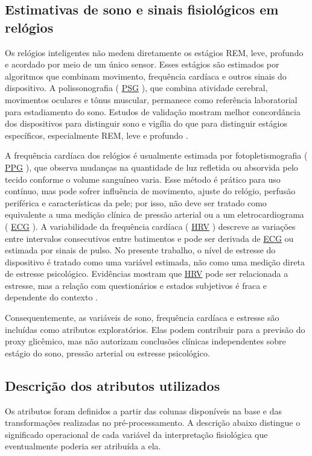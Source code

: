 \documentclass[12pt,a4paper]{article}
\DeclareRobustCommand{\sigla}[1]{%
    \texorpdfstring{\hyperlink{sigla:#1}{#1}}{#1}%
}
\begin{document}
\subsection{Estimativas de sono e sinais fisiológicos em relógios}
Os relógios inteligentes não medem diretamente os estágios REM, leve, profundo
e acordado por meio de um único sensor. Esses estágios são estimados por
algoritmos que combinam movimento, frequência cardíaca e outros sinais do
dispositivo. A polissonografia (\sigla{PSG}), que combina atividade cerebral,
movimentos oculares e tônus muscular, permanece como referência laboratorial
para estadiamento do sono. Estudos de validação mostram melhor concordância
dos dispositivos para distinguir sono e vigília do que para distinguir
estágios específicos, especialmente REM, leve e profundo
\cite{miller2022wearables}.

A frequência cardíaca dos relógios é usualmente estimada por
fotopletismografia (\sigla{PPG}), que observa mudanças na quantidade de luz refletida
ou absorvida pelo tecido conforme o volume sanguíneo varia. Esse método é
prático para uso contínuo, mas pode sofrer influência de movimento, ajuste do
relógio, perfusão periférica e características da pele; por isso, não deve ser
tratado como equivalente a uma medição clínica de pressão arterial ou a um
eletrocardiograma (\sigla{ECG}). A variabilidade da frequência cardíaca (\sigla{HRV}) descreve
as variações entre intervalos consecutivos entre batimentos e pode ser
derivada de \sigla{ECG} ou estimada por sinais de pulso. No presente trabalho, o nível
de estresse do dispositivo é tratado como uma variável estimada, não como uma
medição direta de estresse psicológico. Evidências mostram que \sigla{HRV} pode ser
relacionada a estresse, mas a relação com questionários e estados subjetivos é
fraca e dependente do contexto \cite{miller2022wearables,velmovitsky2023hrvstress}.

Consequentemente, as variáveis de sono, frequência cardíaca e estresse são
incluídas como atributos exploratórios. Elas podem contribuir para a previsão
do proxy glicêmico, mas não autorizam conclusões clínicas independentes sobre
estágio do sono, pressão arterial ou estresse psicológico.

\subsection{Descrição dos atributos utilizados}
Os atributos foram definidos a partir das colunas disponíveis na base e das
transformações realizadas no pré-processamento. A descrição abaixo distingue o
significado operacional de cada variável da interpretação fisiológica que
eventualmente poderia ser atribuída a ela.
\end{document}
